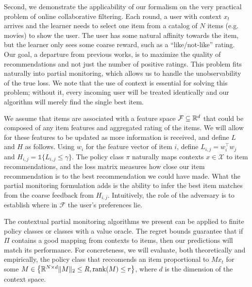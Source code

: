 \documentclass[11pt]{article}
\newcommand{\rank}{\mathrm{rank}}
\begin{document}
Second, we demonstrate the applicability of our formalism on the very practical problem of online collaborative filtering. Each round, a user with context $x_t$ arrives and the learner needs to select one item from a catalog of $N$ items (e.g. movies) to show the user. The user has some natural affinity towards the item, but the learner only sees some coarse reward, such as a ``like/not-like'' rating. Our goal, a departure from previous works, is to maximize the quality of recommendations and not just the number of positive ratings. This problem fits naturally into partial monitoring, which allows us to handle the unobservability of the true loss. We note that the use of context is essential for solving this problem;  without it, every incoming user will be treated identically and our algorithm will merely find the single best item.

We assume that items are associated with a feature space $\mathcal F\subseteq \mathbb R^d$ that could be composed of any item features and aggregated rating of the items. We will allow for these features to be updated as more information is received, and define $L$ and $H$ as follows. Using $w_i$ for the feature vector of item  $i$, define $L_{i,j} = w_i^\top w_j$ and $H_{i,j} = \mathds{1}\{L_{i,j} \leq \gamma\}$. The policy class $\pi$ naturally maps contexts $x\in\mathcal X$ to item recommendations, and the loss matrix measures how close our item recommendation is to the best recommendation we could have made. What the partial monitoring formulation adds is the ability to infer the best item matches from the coarse feedback from $H_{i,j}$. Intuitively, the role of the adversary is to establish where in $\mathcal F$ the user's preferences lie.

The contextual partial monitoring algorithms we present can be applied to finite policy classes or classes with a value oracle. The regret bounds guarantee that if $\Pi$ contains a good mapping from contexts to items, then our predictions will match its performance. For concreteness, we will evaluate, both theoretically and empirically, the policy class
that reccomends an item proportional to $M x_t$ for some $M \in \left\{ \Reals^{N \times d}
    \Vert M\Vert_2 \leq R, \rank(M) \leq r
  \right\}$,
where $d$ is the dimension of the context space. 
\end{document}
